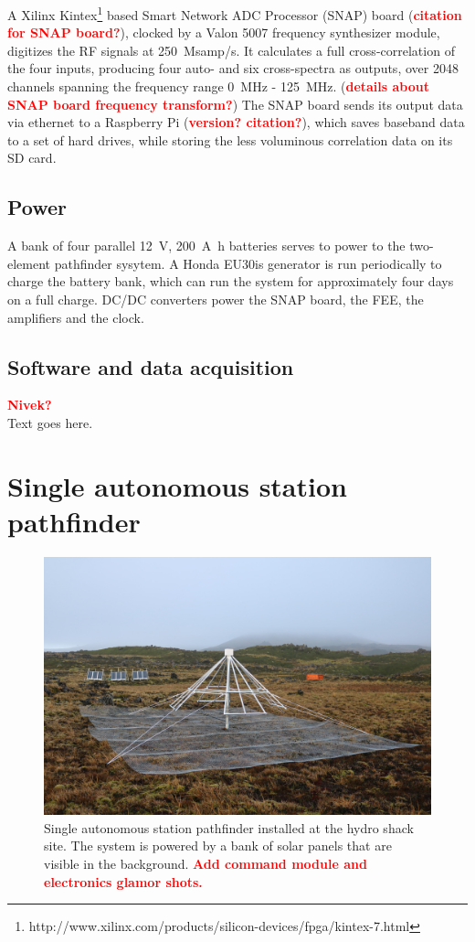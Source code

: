 \documentclass{ws-jai}
\def\prizm{PRI$^{\rm Z}$M}
\newcommand{\attention}[1]{\textcolor{red}{\bf {#1}}}
\begin{document}
A Xilinx Kintex\footnote{http://www.xilinx.com/products/silicon-devices/fpga/kintex-7.html} based Smart Network ADC Processor (SNAP) board (\attention{citation for SNAP board?}), 
clocked by a Valon 5007 frequency synthesizer module,
digitizes the RF signals at 250~Msamp/s. It calculates a full
cross-correlation of the four inputs, producing four auto- and six
cross-spectra as outputs, over 2048 channels spanning the frequency range 
\SI{0}{MHz} - \SI{125}{MHz}. 
(\attention{details about SNAP board frequency transform?})
The SNAP board sends its output data via ethernet to a Raspberry Pi (\attention{version? citation?}), which saves baseband data to a set of hard drives, while storing the less voluminous correlation data on its SD card.

\subsection{Power}

A bank of four parallel \SI{12}{V}, \SI{200}{\ampere\hour} batteries serves to power to the two-element pathfinder sysytem. A Honda EU30is generator is run periodically to charge the battery bank, which can run the system for approximately four days on a full charge.  DC/DC converters power the SNAP board, the FEE, the amplifiers and the clock.
\subsection{Software and data acquisition}
\attention{Nivek?} \\
Text goes here.

\section{Single autonomous station pathfinder}

\begin{figure}
  \begin{center}
    \includegraphics[width=0.7\linewidth]{Figures/autonomous.jpg}
    \caption{Single autonomous station pathfinder installed at the
      hydro shack site.  The system is powered by a bank of solar
      panels that are visible in the background.  \attention{
        Add command module and electronics glamor shots.}}
    \label{Fig:autonomous}
  \end{center}
\end{figure}
\end{document}
